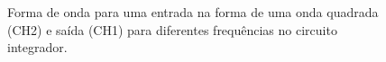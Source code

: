 \begin{figure}[H] 
\centering
{}
\caption{Forma de onda para uma entrada na forma de uma onda quadrada (CH2) e saída (CH1) para diferentes frequências no circuito integrador.}
\end{figure}

